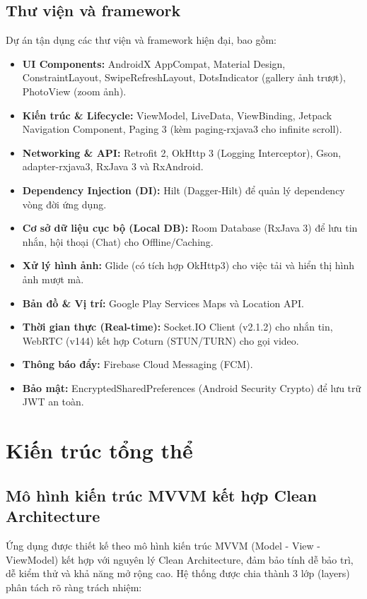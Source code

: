 \subsection{Thư viện và framework}
Dự án tận dụng các thư viện và framework hiện đại, bao gồm:
\begin{itemize}
    \item \textbf{UI Components:} AndroidX AppCompat, Material Design, ConstraintLayout, SwipeRefreshLayout, DotsIndicator (gallery ảnh trượt), PhotoView (zoom ảnh).
    \item \textbf{Kiến trúc \& Lifecycle:} ViewModel, LiveData, ViewBinding, Jetpack Navigation Component, Paging 3 (kèm paging-rxjava3 cho infinite scroll).
    \item \textbf{Networking \& API:} Retrofit 2, OkHttp 3 (Logging Interceptor), Gson, adapter-rxjava3, RxJava 3 và RxAndroid.
    \item \textbf{Dependency Injection (DI):} Hilt (Dagger-Hilt) để quản lý dependency vòng đời ứng dụng.
    \item \textbf{Cơ sở dữ liệu cục bộ (Local DB):} Room Database (RxJava 3) để lưu tin nhắn, hội thoại (Chat) cho Offline/Caching.
    \item \textbf{Xử lý hình ảnh:} Glide (có tích hợp OkHttp3) cho việc tải và hiển thị hình ảnh mượt mà.
    \item \textbf{Bản đồ \& Vị trí:} Google Play Services Maps và Location API.
    \item \textbf{Thời gian thực (Real-time):} Socket.IO Client (v2.1.2) cho nhắn tin, WebRTC (v144) kết hợp Coturn (STUN/TURN) cho gọi video.
    \item \textbf{Thông báo đẩy:} Firebase Cloud Messaging (FCM).
    \item \textbf{Bảo mật:} EncryptedSharedPreferences (Android Security Crypto) để lưu trữ JWT an toàn.
\end{itemize}


\section{Kiến trúc tổng thể}

\subsection{Mô hình kiến trúc MVVM kết hợp Clean Architecture}
Ứng dụng được thiết kế theo mô hình kiến trúc MVVM (Model - View - ViewModel) kết hợp với nguyên lý Clean Architecture, đảm bảo tính dễ bảo trì, dễ kiểm thử và khả năng mở rộng cao. Hệ thống được chia thành 3 lớp (layers) phân tách rõ ràng trách nhiệm:


